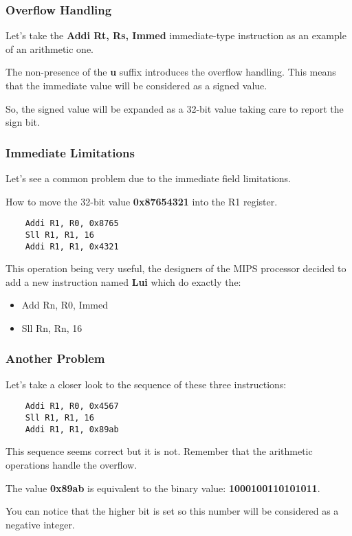 
\begin{frame}
  \frametitle{Overflow Handling}

  Let's take the \textbf{Addi Rt, Rs, Immed} immediate-type
  instruction as an example of an arithmetic one.

  \nl

  The non-presence of the \textbf{u} suffix introduces the overflow
  handling. This means that the immediate value will be considered
  as a signed value.

  \nl

  So, the signed value will be expanded as a 32-bit value taking care
  to report the sign bit.

  \begin{center}
  \end{center}
\end{frame}


\begin{frame}[containsverbatim]
  \frametitle{Immediate Limitations}

  Let's see a common problem due to the immediate field limitations.

  \nl

  How to move the 32-bit value \textbf{0x87654321} into the R1 register.

  \begin{verbatim}
    Addi R1, R0, 0x8765
    Sll R1, R1, 16
    Addi R1, R1, 0x4321
  \end{verbatim}

  This operation being very useful, the designers of the MIPS processor
  decided to add a new instruction named \textbf{Lui} which do
  exactly the:

  \begin{itemize}
    \item
      Add Rn, R0, Immed
    \item
      Sll Rn, Rn, 16
  \end{itemize}
\end{frame}


\begin{frame}[containsverbatim]
  \frametitle{Another Problem}

  Let's take a closer look to the sequence of these three instructions:

  \begin{verbatim}
    Addi R1, R0, 0x4567
    Sll R1, R1, 16
    Addi R1, R1, 0x89ab
  \end{verbatim}

  This sequence seems correct but it is not. Remember that the arithmetic
  operations handle the overflow.

  \nl

  The value \textbf{0x89ab} is equivalent to the binary value:
  \textbf{1000100110101011}.

  \nl

  You can notice that the higher bit is set so this number will be considered
  as a negative integer.
\end{frame}

